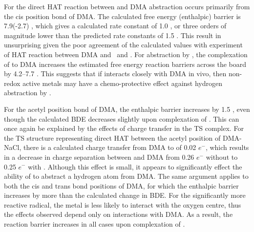 For the direct HAT reaction between  and DMA abstraction occurs
primarily from the cis position  bond of DMA. The calculated free energy
(enthalpic) barrier is 7.9(-2.7) \kcalmol, which gives a calculated rate
constant of 1.0  \Ms, or three orders of magnitude lower than the predicted
rate constants of 1.5  \Ms. This result in unsurprising given the poor
agreement of the calculated values with experiment of HAT reaction between DMA
and \bno\ and \cumo. For abstraction by , the complexation of 
to DMA increases the estimated free energy reaction barriers across the board by
4.2--7.7 \kcalmol. This suggests that if  interacts closely with DMA in
vivo, then non-redox active metals may have a chemo-protective effect against
hydrogen abstraction by .

For the acetyl position  bond of DMA, the enthalpic barrier increases by
1.5 \kcalmol, even though the calculated BDE decreases slightly upon
complexation of . This can once again be explained by the effects of
charge transfer in the TS complex. For the TS structure representing direct HAT
between  the acetyl position of DMA-NaCl, there is a calculated charge
transfer from DMA to  of 0.02 $e^-$, which results in a decrease in
charge separation between  and DMA from 0.26 $e^-$ without  to
0.25 $e^-$ with . Although this effect is small, it appears to
significantly effect the ability of  to abstract a hydrogen atom from
DMA. The same argument applies to both the cis and trans  bond positions
of DMA, for which the enthalpic barrier increases by more than the calculated
change in BDE. For the significantly more reactive  radical, the metal
is less likely to interact with the oxygen centre, thus the effects observed
depend only on interactions with DMA. As a result, the reaction barrier
increases in all cases upon complexation of .
